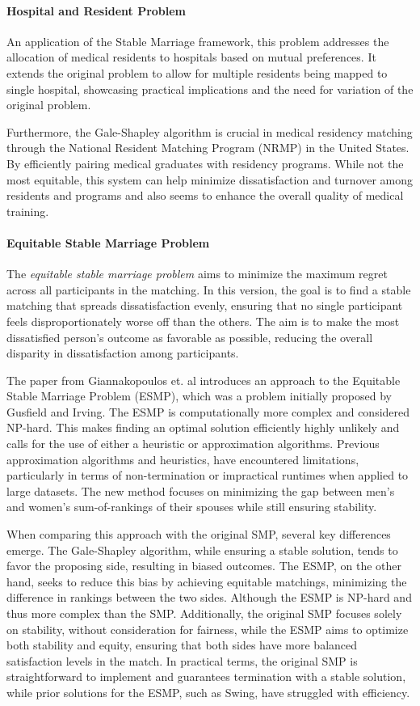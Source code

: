 \paragraph{Hospital and Resident Problem}
An application of the Stable Marriage framework, this problem addresses the allocation of medical residents to hospitals based on mutual preferences. It extends the original problem to allow for multiple residents being mapped to  single hospital, showcasing practical implications and the need for variation of the original problem. 

Furthermore, the Gale-Shapley algorithm is crucial in medical residency matching through the National Resident Matching Program (NRMP) in the United States. By efficiently pairing medical graduates with residency programs. While not the most equitable, this system can help minimize dissatisfaction and turnover among residents and programs and also seems to enhance the overall quality of medical training.
\cite{gusfield}

\paragraph{Equitable Stable Marriage Problem}
The \emph{equitable stable marriage problem} aims to minimize the maximum regret across all participants in the matching. In this version, the goal is to find a stable matching that spreads dissatisfaction evenly, ensuring that no single participant feels disproportionately worse off than the others. The aim is to make the most dissatisfied person's outcome as favorable as possible, reducing the overall disparity in dissatisfaction among participants.

The paper from Giannakopoulos et. al\cite{equitable} introduces an approach to the Equitable Stable Marriage Problem (ESMP), which was a problem initially proposed by Gusfield and Irving. The ESMP is computationally more complex and considered NP-hard. This makes finding an optimal solution efficiently highly unlikely and calls for the use of either a heuristic or approximation algorithms. Previous approximation algorithms and heuristics, have encountered limitations, particularly in terms of non-termination or impractical runtimes when applied to large datasets. The new method focuses on minimizing the gap between men’s and women’s sum-of-rankings of their spouses while still ensuring stability.

When comparing this approach with the original SMP, several key differences emerge. The Gale-Shapley algorithm, while ensuring a stable solution, tends to favor the proposing side, resulting in biased outcomes. The ESMP, on the other hand, seeks to reduce this bias by achieving equitable matchings, minimizing the difference in rankings between the two sides. Although the ESMP is NP-hard and thus more complex than the SMP. Additionally, the original SMP focuses solely on stability, without consideration for fairness, while the ESMP aims to optimize both stability and equity, ensuring that both sides have more balanced satisfaction levels in the match. In practical terms, the original SMP is straightforward to implement and guarantees termination with a stable solution, while prior solutions for the ESMP, such as Swing, have struggled with efficiency.

